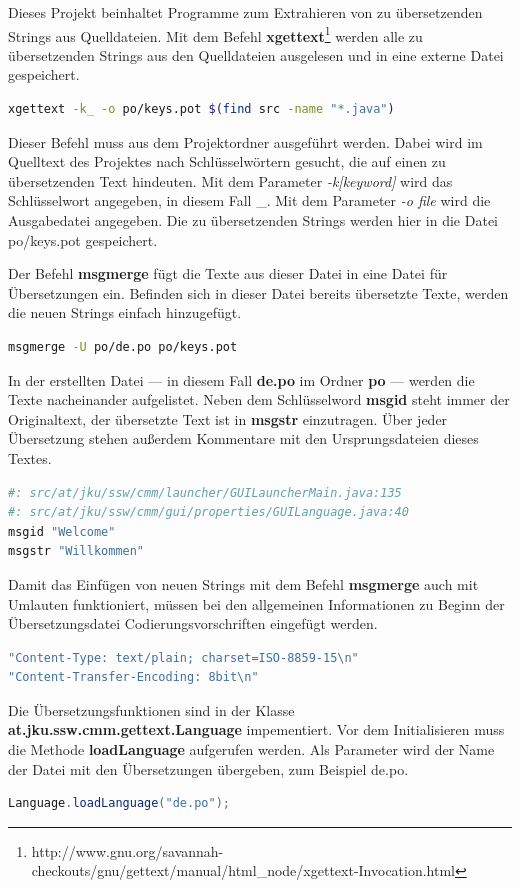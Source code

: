 Dieses Projekt beinhaltet Programme zum Extrahieren von zu übersetzenden Strings aus Quelldateien. Mit dem Befehl \textbf{xgettext}\footnote{http://www.gnu.org/savannah-checkouts/gnu/gettext/manual/html\_node/xgettext-Invocation.html} werden alle zu übersetzenden Strings aus den Quelldateien ausgelesen und in eine externe Datei gespeichert.
\begin{lstlisting}[language=sh]
xgettext -k_ -o po/keys.pot $(find src -name "*.java")
\end{lstlisting}
Dieser Befehl muss aus dem Projektordner ausgeführt werden. Dabei wird im Quelltext des Projektes nach Schlüsselwörtern gesucht, die auf einen zu übersetzenden Text hindeuten. Mit dem Parameter \emph{-k[keyword]} wird das Schlüsselwort angegeben, in diesem Fall \glqq{}\_\grqq{}. Mit dem Parameter \emph{-o file} wird die Ausgabedatei angegeben. Die zu übersetzenden Strings werden hier in die Datei po/keys.pot gespeichert.

Der Befehl \textbf{msgmerge} fügt die Texte aus dieser Datei in eine Datei für Übersetzungen ein. Befinden sich in dieser Datei bereits übersetzte Texte, werden die neuen Strings einfach hinzugefügt.
\begin{lstlisting}[language=sh]
msgmerge -U po/de.po po/keys.pot
\end{lstlisting}

In der erstellten Datei --- in diesem Fall \textbf{de.po} im Ordner \textbf{po} --- werden die Texte nacheinander aufgelistet. Neben dem Schlüsselword \textbf{msgid} steht immer der Originaltext, der übersetzte Text ist in \textbf{msgstr} einzutragen. Über jeder Übersetzung stehen außerdem Kommentare mit den Ursprungsdateien dieses Textes.
\begin{lstlisting}[language=sh]
#: src/at/jku/ssw/cmm/launcher/GUILauncherMain.java:135
#: src/at/jku/ssw/cmm/gui/properties/GUILanguage.java:40
msgid "Welcome"
msgstr "Willkommen"
\end{lstlisting}

Damit das Einfügen von neuen Strings mit dem Befehl \textbf{msgmerge} auch mit Umlauten funktioniert, müssen bei den allgemeinen Informationen zu Beginn der Übersetzungsdatei Codierungsvorschriften eingefügt werden.
\begin{lstlisting}[language=sh]
"Content-Type: text/plain; charset=ISO-8859-15\n"
"Content-Transfer-Encoding: 8bit\n"
\end{lstlisting}

Die Übersetzungsfunktionen sind in der Klasse \textbf{at.jku.ssw.cmm.gettext.Language} impementiert. Vor dem Initialisieren muss die Methode \textbf{loadLanguage} aufgerufen werden. Als Parameter wird der Name der Datei mit den Übersetzungen übergeben, zum Beispiel \glqq{}de.po\grqq{}.
\begin{lstlisting}[language=JAVA]
Language.loadLanguage("de.po");
\end{lstlisting}

